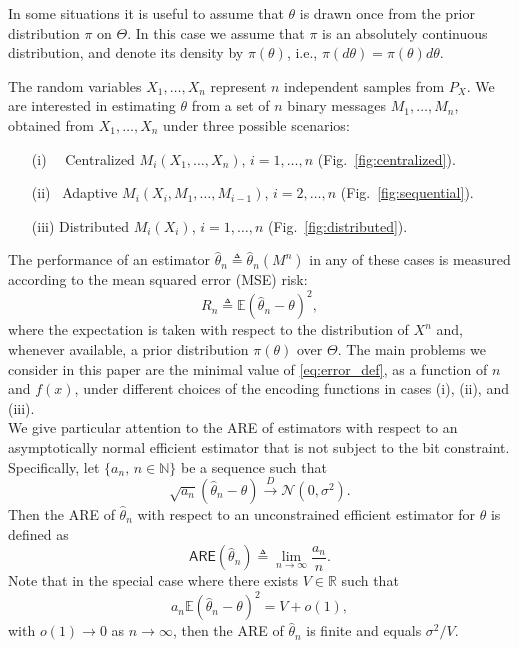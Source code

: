 \documentclass[letterpaper, 11pt]{IEEEtran}      %
\newcommand{\ARE}{\mathsf{ARE}}
\begin{document}
\par
In some situations it is useful to assume that $\theta$ is drawn once from the prior distribution $\pi$ on $\Theta$. In this case we assume that $\pi$ is an absolutely continuous distribution, and denote its density by $\pi(\theta)$, i.e., $\pi(d\theta) = \pi(\theta)d\theta$.  
\par
The random variables $X_1,\ldots,X_n$ represent $n$ independent samples from $P_X$. 
We are interested in estimating $\theta$ from a set of $n$ binary messages $M_1,\ldots,M_n$, obtained from $X_1,\ldots,X_n$ under three possible scenarios: 
\begin{itemize}
\item[(i)~~] Centralized $M_i(X_1,\ldots,X_n)$, $i=1,\ldots,n$ (Fig.~\ref{fig:centralized}).
\item[(ii)~] Adaptive $M_i(X_i,M_1,\ldots,M_{i-1})$, $i=2,\ldots,n$ (Fig.~\ref{fig:sequential}).
\item[(iii)] Distributed $M_i(X_i)$, $i=1,\ldots,n$ (Fig.~\ref{fig:distributed}).
\end{itemize}

The performance of an estimator $\hat{\theta}_n \triangleq \hat{\theta}_n(M^n)$ in any of these cases is measured according to the mean squared error (MSE) risk:
\begin{equation}
\label{eq:error_def}
R_n \triangleq \mathbb E\left(\hat{\theta}_n - \theta \right)^2,
\end{equation}
where the expectation is taken with respect to the distribution of $X^n$ and, whenever available, a prior distribution $\pi(\theta)$ over $\Theta$.  
%
The main problems we consider in this paper are the minimal value of \eqref{eq:error_def}, as a function of $n$ and $f(x)$, under different choices of the encoding functions in cases (i), (ii), and (iii). \\

We give particular attention to the ARE of estimators with respect to an asymptotically normal efficient estimator that is not subject to the bit constraint. Specifically, let $\{a_n,\,n\in \mathbb N\}$ be a sequence such that 
\[
\sqrt{a_n}\left(\hat{\theta}_n - \theta\right) \overset{D}{\longrightarrow} \mathcal N(0, \sigma^2).
\]
Then the ARE of $\hat{\theta}_n$ with respect to an unconstrained efficient estimator for $\theta$ is defined as \cite[Def. 6.6.6]{lehmann2006theory}
\[
\ARE(\hat{\theta}_n) \triangleq
\lim_{n\rightarrow \infty} \frac{a_n}{n}. 
\]
Note that in the special case where there exists $V \in \mathbb R$ such that
\[
a_n \mathbb E \left(\hat{\theta}_n - \theta \right)^2 = V + o(1),
\]
with $o(1)\to 0$ as $n\to \infty$, then the ARE of $\hat{\theta}_n$ is finite and equals $\sigma^2/V$. \\
\end{document}
